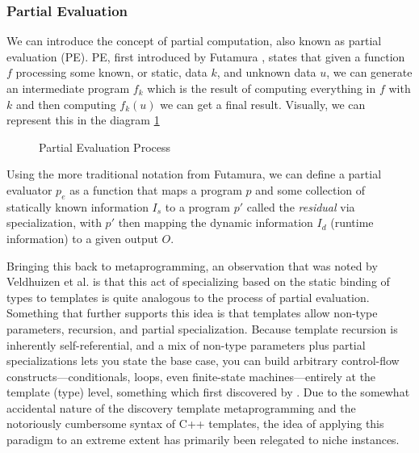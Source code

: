 \subsubsection{Partial Evaluation}

We can introduce the concept of partial computation, also known as partial evaluation (PE). PE, first introduced by Futamura \cite{Futamura1983}, states that given a function $f$ processing some known, or static, data $k$, and unknown data $u$, we can generate an intermediate program $f_k$ which is the result of computing everything in $f$ with $k$ and then computing $f_k(u)$ we can get a final result. Visually, we can represent this in the diagram \ref{fig:partial_eval_graph}

\begin{figure}[ht!]
  \centering
  
  \caption{Partial Evaluation Process \cite{Futamura1983}}
  \label{fig:partial_eval_graph}
  \Description{}
\end{figure}

\begin{definition}

Using the more traditional notation from Futamura, we can define a partial evaluator $p_e$ as a function that maps a program $p$ and some collection of statically known information $I_s$ to a program $p'$ called the \textit{residual} via specialization, with $p'$ then mapping the dynamic information $I_d$ (\ie runtime information) to a given output $O$. 



\end{definition}

Bringing this back to metaprogramming, an observation that was noted by Veldhuizen et al. \cite{Veldhuizen1998} is that this act of specializing based on the static binding of types to templates is quite analogous to the process of partial evaluation. Something that further supports this idea is that templates allow non-type parameters, recursion, and partial specialization. Because template recursion is inherently self-referential, and a mix of non-type parameters plus partial specializations lets you state the base case, you can build arbitrary control-flow constructs—conditionals, loops, even finite-state machines—entirely at the template (\ie type) level, something which first discovered by \cite{unruh1994prime}. Due to the somewhat accidental nature of the discovery template metaprogramming and the notoriously cumbersome syntax of C++ templates, the idea of applying this paradigm to an extreme extent has primarily been relegated to niche instances.


